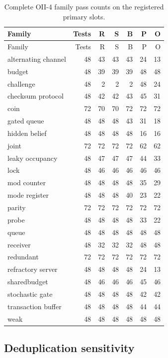 \begingroup\small
\setlength{\tabcolsep}{5pt}
\begin{longtable}{lrrrrrr}
\caption{Complete OII-4 family pass counts on the registered primary slots.}\label{tab:family-full}\\
\toprule
Family & Tests & R & S & B & P & O \\
\midrule
\endfirsthead
\toprule
Family & Tests & R & S & B & P & O \\
\midrule
\endhead
alternating channel & 48 & 43 & 43 & 43 & 24 & 13 \\
budget & 48 & 39 & 39 & 39 & 48 & 48 \\
challenge & 48 & 2 & 2 & 2 & 48 & 24 \\
checksum protocol & 48 & 42 & 42 & 43 & 45 & 31 \\
coin & 72 & 70 & 70 & 72 & 72 & 72 \\
gated queue & 48 & 48 & 48 & 43 & 31 & 18 \\
hidden belief & 48 & 48 & 48 & 48 & 16 & 16 \\
joint & 72 & 72 & 72 & 72 & 62 & 62 \\
leaky occupancy & 48 & 47 & 47 & 47 & 44 & 33 \\
lock & 48 & 46 & 46 & 46 & 46 & 46 \\
mod counter & 48 & 48 & 48 & 48 & 35 & 29 \\
mode register & 48 & 48 & 48 & 40 & 23 & 22 \\
parity & 72 & 72 & 72 & 72 & 72 & 72 \\
probe & 48 & 48 & 48 & 48 & 33 & 22 \\
queue & 48 & 48 & 48 & 48 & 48 & 48 \\
receiver & 48 & 32 & 32 & 32 & 48 & 48 \\
redundant & 72 & 72 & 72 & 72 & 72 & 72 \\
refractory server & 48 & 48 & 48 & 48 & 24 & 13 \\
sharedbudget & 48 & 46 & 46 & 46 & 45 & 46 \\
stochastic gate & 48 & 48 & 48 & 48 & 42 & 42 \\
transaction buffer & 48 & 48 & 48 & 48 & 44 & 44 \\
weak & 48 & 48 & 48 & 48 & 48 & 48 \\
\bottomrule
\end{longtable}
\endgroup



\subsection{Deduplication sensitivity}

